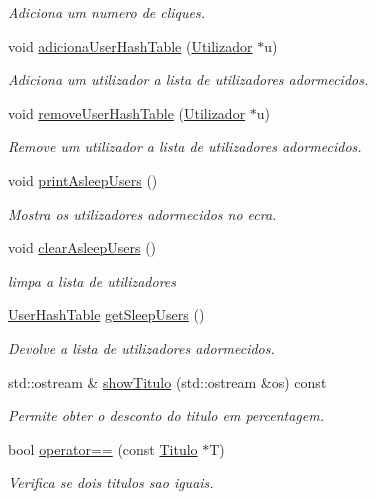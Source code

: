 \begin{DoxyCompactItemize}
\begin{DoxyCompactList}\small\item\em Adiciona um numero de cliques. \end{DoxyCompactList}\item 
void \hyperlink{classTitulo_a64300cd5c0c717f77666413127404d36}{adiciona\+User\+Hash\+Table} (\hyperlink{classUtilizador}{Utilizador} $\ast$u)
\begin{DoxyCompactList}\small\item\em Adiciona um utilizador a lista de utilizadores adormecidos. \end{DoxyCompactList}\item 
void \hyperlink{classTitulo_a66ee2ff7b95cf280a667dc87477a0ae1}{remove\+User\+Hash\+Table} (\hyperlink{classUtilizador}{Utilizador} $\ast$u)
\begin{DoxyCompactList}\small\item\em Remove um utilizador a lista de utilizadores adormecidos. \end{DoxyCompactList}\item 
void \hyperlink{classTitulo_ab14d7a11d5b91dec67fb115cfa83d860}{print\+Asleep\+Users} ()
\begin{DoxyCompactList}\small\item\em Mostra os utilizadores adormecidos no ecra. \end{DoxyCompactList}\item 
void \hyperlink{classTitulo_aa3c77caaee860b214308cf0d2944b835}{clear\+Asleep\+Users} ()
\begin{DoxyCompactList}\small\item\em limpa a lista de utilizadores \end{DoxyCompactList}\item 
\hyperlink{Titulo_8h_a0996281e9e5d419736dec228200cfdc5}{User\+Hash\+Table} \hyperlink{classTitulo_ae38bebc95efb3405d5cd9ca71aa98ab2}{get\+Sleep\+Users} ()
\begin{DoxyCompactList}\small\item\em Devolve a lista de utilizadores adormecidos. \end{DoxyCompactList}\item 
std\+::ostream \& \hyperlink{classTitulo_ab31e1d801062a75abdb10664de23d897}{show\+Titulo} (std\+::ostream \&os) const
\begin{DoxyCompactList}\small\item\em Permite obter o desconto do titulo em percentagem. \end{DoxyCompactList}\item 
bool \hyperlink{classTitulo_ac0622a3b256910ac87ee900a9be014b6}{operator==} (const \hyperlink{classTitulo}{Titulo} $\ast$T)
\begin{DoxyCompactList}\small\item\em Verifica se dois titulos sao iguais. \end{DoxyCompactList}\end{DoxyCompactItemize}
